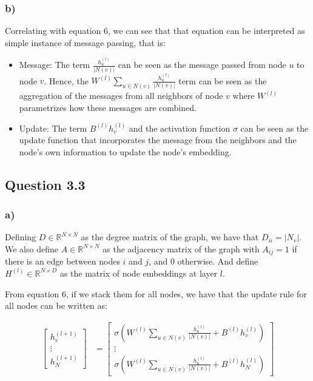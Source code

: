 \documentclass{article}
\begin{document}
\subsubsection*{b)}

Correlating with equation 6, we can see that that equation can be interpreted as simple instance of message passing, that is:

\begin{itemize}
    \item Message: The term $\frac{h_u^{(l)}}{|N(v)|}$ can be seen as the message passed from node $u$ to node $v$. Hence,
the $W^{(l)} \sum_{u \in N(v)} \frac{h_u^{(l)}}{|N(v)|}$ term can be seen as the aggregation of the messages from all neighbors of node $v$
where $W^{(l)}$ parametrizes how these messages are combined.
    \item Update: The term $B^{(l)}h_v^{(l)}$ and the activation function $\sigma$ can be seen as the update function that
incorporates the message from the neighbors and the node's own information to update the node's embedding.
\end{itemize}

\subsection*{Question 3.3}

\subsubsection*{a)}

Defining $D \in \mathbb{R}^{N \times N}$ as the degree matrix of the graph, we have that $D_{ii} = |N_v|$. We also define
$A \in \mathbb{R}^{N \times N}$ as the adjacency matrix of the graph with $A_{ij} = 1$ if there is an edge between nodes $i$ and $j$,
and $0$ otherwise. And define $H^{(l)} \in \mathbb{R}^{N \times D}$ as the matrix of node embeddings at layer $l$.

From equation 6, if we stack them for all nodes, we have that the update rule for all nodes can be written as:

\begin{align*}
    \begin{bmatrix}
        h_v^{(l+1)} \\
        \vdots \\
        h_N^{(l+1)}
    \end{bmatrix}
    & =  \begin{bmatrix}
        \sigma \left(W^{(l)} \sum_{u \in N(v)} \frac{h_u^{(l)}}{|N(v)|} + B^{(l)}h_v^{(l)}\right) \\
        \vdots \\
        \sigma \left(W^{(l)} \sum_{u \in N(v)} \frac{h_u^{(l)}}{|N(v)|} + B^{(l)}h_N^{(l)}\right)
    \end{bmatrix}  \\
\end{align*}
\end{document}
